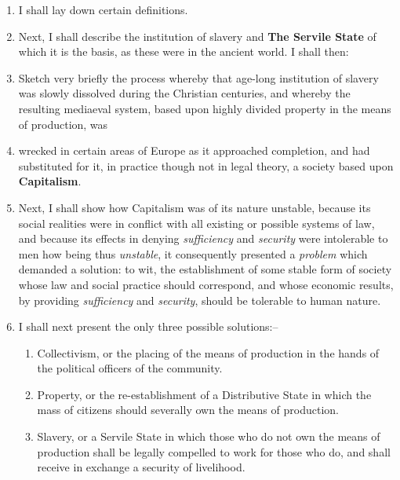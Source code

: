 \documentclass{book}
\newcommand\mdstrong[1]{\textbf{#1}}
\begin{document}
\begin{enumerate}
\item I shall lay down certain definitions.


\item Next, I shall describe the institution of slavery and \mdstrong{The Servile State} of which it is the basis, as these were in the ancient world. I shall then:


\item Sketch very briefly the process whereby that age-long institution of slavery was slowly dissolved during the Christian centuries, and whereby the resulting mediaeval system, based upon highly divided property in the means of production, was


\item wrecked in certain areas of Europe as it approached completion, and had substituted for it, in practice though not in legal theory, a society based upon \mdstrong{Capitalism}.


\item Next, I shall show how Capitalism was of its nature unstable, because its social realities were in conflict with all existing or possible systems of law, and because its effects in denying \emph{sufficiency} and \emph{security} were intolerable to men how being thus \emph{unstable}, it consequently presented a \emph{problem} which demanded a solution: to wit, the establishment of some stable form of society whose law and social practice should correspond, and whose economic results, by providing \emph{sufficiency} and \emph{security}, should be tolerable to human nature.


\item I shall next present the only three possible solutions:–

\begin{enumerate}
\item Collectivism, or the placing of the means of production in the hands of the political officers of the community.


\item Property, or the re-establishment of a Distributive State in which the mass of citizens should severally own the means of production.


\item Slavery, or a Servile State in which those who do not own the means of production shall be legally compelled to work for those who do, and shall receive in exchange a security of livelihood.




\end{enumerate}
\end{enumerate}
\end{document}
